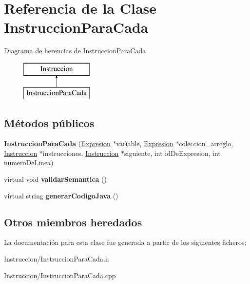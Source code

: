\hypertarget{class_instruccion_para_cada}{\section{Referencia de la Clase Instruccion\-Para\-Cada}
\label{class_instruccion_para_cada}
}
Diagrama de herencias de Instruccion\-Para\-Cada\begin{figure}[H]
\begin{center}
\leavevmode
\includegraphics[height=2.000000cm]{class_instruccion_para_cada}
\end{center}
\end{figure}
\subsection*{Métodos públicos}
\begin{DoxyCompactItemize}
\item 
\hypertarget{class_instruccion_para_cada_aa7a2b691820b92de13a7c9bc2a0769d0}{{\bfseries Instruccion\-Para\-Cada} (\hyperlink{class_expresion}{Expresion} $\ast$variable, \hyperlink{class_expresion}{Expresion} $\ast$coleccion\-\_\-arreglo, \hyperlink{class_instruccion}{Instruccion} $\ast$instrucciones, \hyperlink{class_instruccion}{Instruccion} $\ast$siguiente, int id\-De\-Expresion, int numero\-De\-Linea)}\label{class_instruccion_para_cada_aa7a2b691820b92de13a7c9bc2a0769d0}

\item 
\hypertarget{class_instruccion_para_cada_a177a6b78748dfd96139f00e2ad417ec1}{virtual void {\bfseries validar\-Semantica} ()}\label{class_instruccion_para_cada_a177a6b78748dfd96139f00e2ad417ec1}

\item 
\hypertarget{class_instruccion_para_cada_ade8876617a19596c63281c0f36f01155}{virtual string {\bfseries generar\-Codigo\-Java} ()}\label{class_instruccion_para_cada_ade8876617a19596c63281c0f36f01155}

\end{DoxyCompactItemize}
\subsection*{Otros miembros heredados}


La documentación para esta clase fue generada a partir de los siguientes ficheros\-:\begin{DoxyCompactItemize}
\item 
Instruccion/Instruccion\-Para\-Cada.\-h\item 
Instruccion/Instruccion\-Para\-Cada.\-cpp\end{DoxyCompactItemize}
